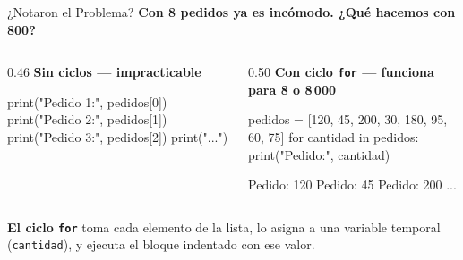 \documentclass[aspectratio=169, 11pt]{beamer}
\begin{document}
\begin{frame}[fragile,shrink=30]{¿Notaron el Problema?}
  \vspace{-6pt}
  {\small\color{arcaDark}\bfseries
    Con 8 pedidos ya es incómodo. ¿Qué hacemos con 800?}

  \vspace{4pt}
  \begin{columns}[T]
    \begin{column}{0.46\textwidth}
      {\scriptsize\color{arcaRed}\bfseries\faTimesCircle\hspace{4pt}
        Sin ciclos --- impracticable}
      \begin{pyblock}
print("Pedido 1:", pedidos[0])
print("Pedido 2:", pedidos[1])
print("Pedido 3:", pedidos[2])
print("...")
      \end{pyblock}
    \end{column}

    \begin{column}{0.50\textwidth}
      {\scriptsize\color{codeGreen}\bfseries\faCheckCircle\hspace{4pt}
        Con ciclo \texttt{for} --- funciona para 8 o 8\,000}
      \begin{pyblock}
pedidos = [120, 45, 200, 30, 180, 95, 60, 75]
for cantidad in pedidos:
    print("Pedido:", cantidad)
      \end{pyblock}
      \vspace{-2pt}
      \begin{outputblock}
Pedido: 120
Pedido: 45
Pedido: 200
...
      \end{outputblock}
    \end{column}
  \end{columns}

  \vspace{4pt}
  {\footnotesize\color{arcaDark}
    \textbf{El ciclo \texttt{for}} toma cada elemento de la lista,
    lo asigna a una variable temporal (\texttt{cantidad}),
    y ejecuta el bloque indentado con ese valor.}
\end{frame}
\end{document}
